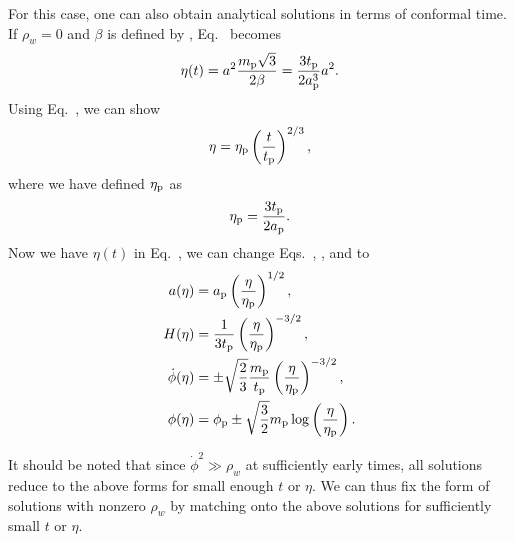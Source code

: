 For this case, one can also obtain analytical solutions in terms of
conformal time.  If $\rho_w=0$ and $\beta$ is defined by
, Eq.\  becomes
%
\begin{equation}
  \eta(t) 
  = 
  a^2 \frac{m_{\mathrm{p}}\sqrt{3}}{2\beta}
  =
  \frac{3t_{\mathrm{p}}}{2a_{\mathrm{p}}^3}a^2.
  \label{eqn:eta_of_t}
\end{equation}
%
Using Eq.\ , we can show
%
\begin{equation}
  \eta
  =
  \eta_{\mathrm{p}}\left(\frac{t}{t_{\mathrm{p}}}\right)^{2/3},
\end{equation}
%
where we have defined $\eta_{\mathrm{p}}$ as
%
\begin{equation}
  \eta_{\mathrm{p}}
  =
  \frac{3t_{\mathrm{p}}}{2a_{\mathrm{p}}}.
  \label{eqn:etap_eq}
\end{equation}
%
Now we have $\eta(t)$ in Eq.\ , we can change
Eqs.\ , ,
 and  to
%
\begin{align}
  a(\eta)
  &=
  a_{\mathrm{p}} \left(\frac{\eta}{\eta_{\mathrm{p}}}\right)^{1/2},
  \\
  H(\eta)
  &=
  \frac{1}{3t_{\mathrm{p}}}\left(\frac{\eta}{\eta_{\mathrm{p}}}\right)^{-3/2},
  \\
  \dot{\phi}(\eta)
  &=
  \pm\sqrt{\frac{2}{3}}
  \frac{m_{\mathrm{p}}}{t_{\mathrm{p}}}\left(\frac{\eta}{\eta_{\mathrm{p}}}\right)^{-3/2},
  \\
  \phi(\eta)
  &=
  \phi_{\mathrm{p}} \pm\sqrt{\frac{3}{2}}m_{\mathrm{p}}\log\left(\frac{\eta}{\eta_{\mathrm{p}}}\right). 
  \label{eqn:phi_flat}
\end{align}
%

It should be noted that since $\dot{\phi}^2 \gg \rho_w$ at
sufficiently early times, all solutions reduce to the above forms for
small enough $t$ or $\eta$. We can thus fix the form of solutions
with nonzero $\rho_w$ by matching onto the above solutions for
sufficiently small $t$ or $\eta$.  

